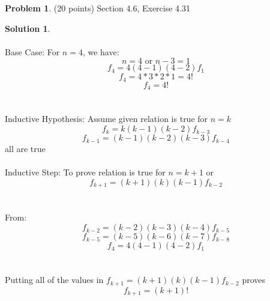 \documentclass{article}
\theoremstyle{definition}
\newtheorem{problem}{Problem}
\newtheorem*{solution}{Solution}
\begin{document}
\newpage
\begin{problem} (20 points) Section 4.6, Exercise 4.31
\end{problem}
\begin{solution}
  ~\\
  ~\\
  Base Case:
  For \(n = 4\), we have:
  \[
    n = 4 \text{ or } n -3 = 1
  \]
  \[
    f_4 = 4(4-1)(4-2)f_1
  \]
  \[
    f_4 = 4 * 3 * 2 * 1 = 4!
  \]
  \[
    f_4 = 4!
  \]
  ~\\
  ~\\
  Inductive Hypothesis:
  Assume given relation is true for $n = k$
  \[
    f_k = k(k-1)(k-2)f_{k-3}
  \]
  \[
    f_{k-1} = (k-1)(k-2)(k-3)f_{k-4}
  \]
  all are true ~\\ ~\\ Inductive Step: To prove relation is true for $n=k+1$ or
  \[
    f_{k+1} = (k+1)(k)(k-1)f_{k-2}
  \]
  ~\\
  ~\\
  From:
  \[
    f_{k-2} = (k-2)(k-3)(k-4)f_{k-5}
  \]
  \[
    f_{k-5} = (k-5)(k-6)(k-7)f_{k-8}
  \]
  \[
    f_4 = 4(4-1)(4-2)f_1
  \]
  ~\\
  ~\\
  Putting all of the values in $f_{k+1} = (k+1)(k)(k-1)f_{k-2}$ proves
  \[
    f_{k+1} = (k+1)!
  \]
\end{solution}
\end{document}

